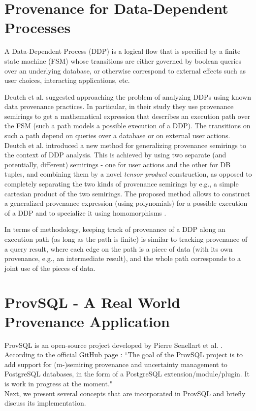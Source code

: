 \section{Provenance for Data-Dependent Processes}
A Data-Dependent Process (DDP) is a logical flow that is specified by a finite state machine (FSM) whose transitions are either governed by boolean queries over an underlying database, or otherwise correspond to external effects such as user choices, interacting applications, etc.
\par Deutch et al. \cite{Deutch_DDP} suggested approaching the problem of analyzing DDPs using known data provenance practices. In particular, in their study they use provenance semirings \cite{green2007provenance} to get a mathematical expression that describes an execution path over the FSM (such a path models a possible execution of a DDP). The transitions on such a path depend on queries over a database or on external user actions. Deutch et al. introduced a new method for generalizing provenance semirings to the context of DDP analysis. This is achieved by using two separate (and potentially, different) semirings - one for user actions and the other for DB tuples, and combining them by a novel \textit{tensor product} construction, as opposed to completely separating the two kinds of provenance semirings by e.g., a simple cartesian product of the two semirings. The proposed method allows to construct a generalized provenance expression (using polynomials) for a possible execution of a DDP and to specialize it using homomorphisms \cite{green2007provenance}.
\par In terms of methodology, keeping track of provenance of a DDP along an execution path (as long as the path is finite) is similar to tracking provenance of a query result, where each edge on the path is a piece of data (with its own provenance, e.g., an intermediate result), and the whole path corresponds to a joint use of the pieces of data.


\section{ProvSQL - A Real World Provenance Application}\label{sec:provsql}
ProvSQL is an open-source project developed by Pierre Senellart et al. \cite{Senellart2018}.
According to the official GitHub page \cite{provsql_github}:
``The goal of the ProvSQL project is to add support for (m-)semiring provenance and uncertainty management to PostgreSQL databases, in the form of a PostgreSQL extension/module/plugin. It is work in progress at the moment." \\
Next, we present several concepts that are incorporated in ProvSQL and briefly discuss its implementation.
